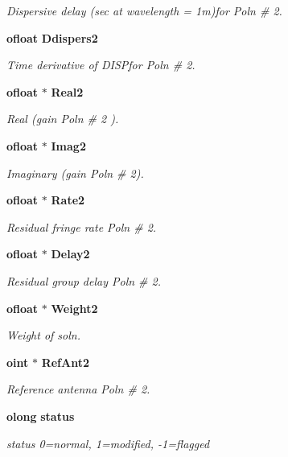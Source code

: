 \begin{CompactItemize}
\begin{CompactList}\small\item\em Dispersive delay (sec at wavelength = 1m)for Poln \# 2. \item\end{CompactList}\item 
{\bf ofloat} {\bf Ddispers2}
\begin{CompactList}\small\item\em Time derivative of DISPfor Poln \# 2. \item\end{CompactList}\item 
{\bf ofloat} $\ast$ {\bf Real2}
\begin{CompactList}\small\item\em Real (gain Poln \# 2 ). \item\end{CompactList}\item 
{\bf ofloat} $\ast$ {\bf Imag2}
\begin{CompactList}\small\item\em Imaginary (gain Poln \# 2). \item\end{CompactList}\item 
{\bf ofloat} $\ast$ {\bf Rate2}
\begin{CompactList}\small\item\em Residual fringe rate Poln \# 2. \item\end{CompactList}\item 
{\bf ofloat} $\ast$ {\bf Delay2}
\begin{CompactList}\small\item\em Residual group delay Poln \# 2. \item\end{CompactList}\item 
{\bf ofloat} $\ast$ {\bf Weight2}
\begin{CompactList}\small\item\em Weight of soln. \item\end{CompactList}\item 
{\bf oint} $\ast$ {\bf Ref\-Ant2}
\begin{CompactList}\small\item\em Reference antenna Poln \# 2. \item\end{CompactList}\item 
{\bf olong} {\bf status}
\begin{CompactList}\small\item\em status 0=normal, 1=modified, -1=flagged \item\end{CompactList}\end{CompactItemize}


